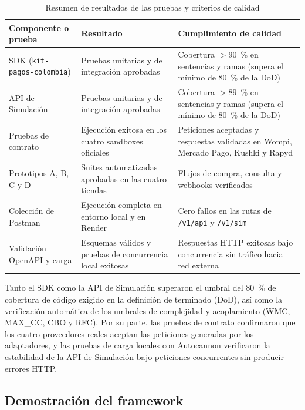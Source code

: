 \begin{table}[H]
  \centering
  \small
  \renewcommand{\arraystretch}{1.2}
  \begin{tabularx}{\textwidth}{|>{\raggedright\arraybackslash}p{3.4cm}|>{\raggedright\arraybackslash}X|>{\raggedright\arraybackslash}p{4.6cm}|}
    \hline
    \textbf{Componente o prueba} & \textbf{Resultado} & \textbf{Cumplimiento de calidad} \\ \hline
    SDK (\texttt{kit-pagos-colombia}) & Pruebas unitarias y de integración aprobadas & Cobertura $> 90$~\% en sentencias y ramas (supera el mínimo de 80~\% de la DoD) \\ \hline
    API de Simulación & Pruebas unitarias y de integración aprobadas & Cobertura $> 89$~\% en sentencias y ramas (supera el mínimo de 80~\% de la DoD) \\ \hline
    Pruebas de contrato & Ejecución exitosa en los cuatro sandboxes oficiales & Peticiones aceptadas y respuestas validadas en Wompi, Mercado Pago, Kushki y Rapyd \\ \hline
    Prototipos A, B, C y D & Suites automatizadas aprobadas en las cuatro tiendas & Flujos de compra, consulta y webhooks verificados \\ \hline
    Colección de Postman & Ejecución completa en entorno local y en Render & Cero fallos en las rutas de \texttt{/v1/api} y \texttt{/v1/sim} \\ \hline
    Validación OpenAPI y carga & Esquemas válidos y pruebas de concurrencia local exitosas & Respuestas HTTP exitosas bajo concurrencia sin tráfico hacia red externa \\ \hline
  \end{tabularx}
  \caption{Resumen de resultados de las pruebas y criterios de calidad}
  \label{tab:suites-memoria}
\end{table}

Tanto el SDK como la API de Simulación superaron el umbral del 80~\% de cobertura de código exigido en la definición de terminado (DoD), así como la verificación automática de los umbrales de complejidad y acoplamiento (WMC, MAX\_CC, CBO y RFC). Por su parte, las pruebas de contrato confirmaron que los cuatro proveedores reales aceptan las peticiones generadas por los adaptadores, y las pruebas de carga locales con Autocannon verificaron la estabilidad de la API de Simulación bajo peticiones concurrentes sin producir errores HTTP.

\subsection{Demostración del framework}
\label{sec:vii-demostracion}

